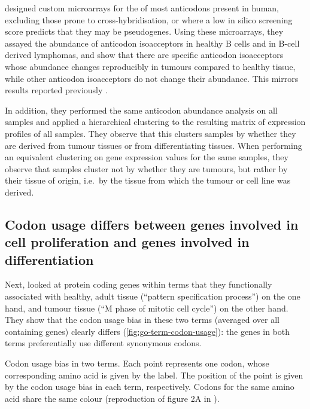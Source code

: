 \citet{Gingold:2014} designed custom microarrays for the \trna[s] of most
anticodons present in human, excluding those prone to cross-hybridi\-sation, or
where a low in silico screening score predicts that they may be pseudogenes.
Using these microarrays, they assayed the abundance of anticodon isoacceptors in
healthy B cells and in B-cell derived lymphomas, and show that there are
specific anticodon isoacceptors whose abundance changes reproducibly in tumours
compared to healthy tissue, while other anticodon isoacceptors do not change
their abundance. This mirrors results reported previously
\citep{Pavon-Eternod:2009}.

In addition, they performed the same \trna anticodon abundance analysis on all
samples and applied a hierarchical clustering to the resulting matrix of \trna
expression profiles of all samples. They observe that this clusters samples by
whether they are derived from tumour tissues or from differentiating tissues.
When performing an equivalent clustering on \mrna gene expression values for the
same samples, they observe that samples cluster not by whether they are tumours,
but rather by their tissue of origin, i.e.\ by the tissue from which the tumour
or cell line was derived.

\subsection{Codon usage differs between genes involved in cell proliferation and
genes involved in differentiation}

Next, \citet{Gingold:2014} looked at protein coding genes within \go terms that
they functionally associated with healthy, adult tissue (“pattern specification
process”) on the one hand, and tumour tissue (“M phase of mitotic cell cycle”)
on the other hand. They show that the codon usage bias in these two \go terms
(averaged over all containing genes) clearly differs
(\cref{fig:go-term-codon-usage}): the genes in both \go terms preferentially use
different synonymous codons.

    {Codon usage bias in two  terms.}
    {Each point represents one codon, whose corresponding amino acid is given by
    the label. The position of the point is given by the codon usage bias in
    each \go term, respectively. Codons for the same amino acid share the same
    colour (reproduction of figure 2A in \citet{Gingold:2014}).}

